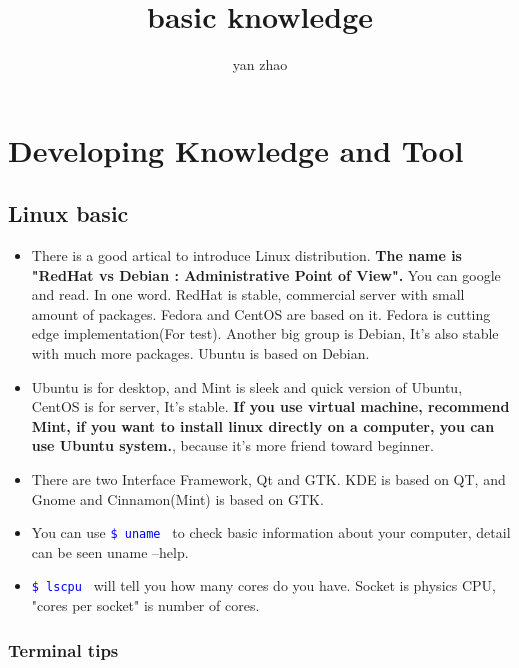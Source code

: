 \documentclass[a4paper,12pt,twoside]{book}
\newcommand{\linuxcommand}[1]{\texttt{\textcolor{blue}{\$ #1 \Pisymbol{psy}{191}}}}
\begin{document}
\title{basic knowledge}
\author{yan zhao}
\date{}\maketitle

\tableofcontents

\else
\chapter{Developing Knowledge and Tool}
\fi

\section{Linux basic}
\begin{itemize}
		\item There is a good artical to introduce Linux distribution. \textbf{The name is "RedHat vs Debian : Administrative Point of View".} You can google and read. In one word. RedHat is stable, commercial server with small amount of packages. Fedora and CentOS are based on it. Fedora is cutting edge implementation(For test). Another big group is Debian, It's also stable with much more packages. Ubuntu is based on Debian.

		\item Ubuntu is for desktop, and Mint is sleek and quick version of Ubuntu, CentOS is for server, It's stable. \textbf{If you use virtual machine, recommend Mint, if you want to install linux directly on a computer, you can use Ubuntu system.}, because it's more friend toward beginner. 

\item There are two Interface Framework, Qt and GTK\@.  KDE is based on QT, and Gnome and Cinnamon(Mint) is based on GTK.  

\item You can use \linuxcommand{uname} to check basic information about your computer, detail can be seen uname --help. 

\item \linuxcommand{lscpu} will tell you how many cores do you have. Socket is physics CPU, "cores per socket" is number of cores. 
\end{itemize}

\subsection{Terminal tips}
\end{document}
